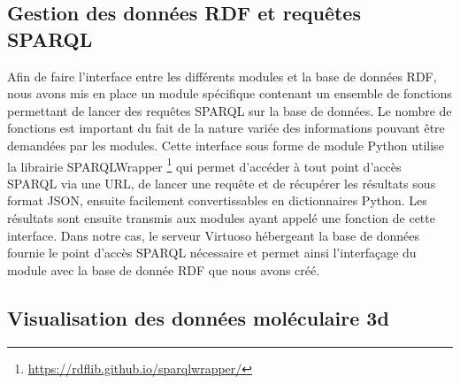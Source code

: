 \subsection{Gestion des données RDF et requêtes SPARQL}

Afin de faire l'interface entre les différents modules et la base de données RDF, nous avons mis en place un module spécifique contenant un ensemble de fonctions permettant de lancer des requêtes SPARQL sur la base de données. Le nombre de fonctions est important du fait de la nature variée des informations pouvant être demandées par les modules. Cette interface sous forme de module Python utilise la librairie SPARQLWrapper \footnote{\url{https://rdflib.github.io/sparqlwrapper/}} qui permet d'accéder à tout point d'accès SPARQL via une URL, de lancer une requête et de récupérer les résultats sous format JSON, ensuite facilement convertissables en dictionnaires Python. Les résultats sont ensuite transmis aux modules ayant appelé une fonction de cette interface. Dans notre cas, le serveur Virtuoso hébergeant la base de données fournie le point d'accès SPARQL nécessaire et permet ainsi l'interfaçage du module avec la base de donnée RDF que nous avons créé.

\subsection{Visualisation des données moléculaire 3d}

